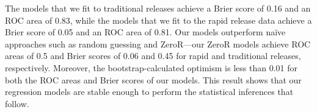\begin{sloppypar}
\noindent{}
The models that we fit to traditional releases achieve a Brier score of 0.16 and
an ROC area of 0.83, while the models that we fit to the rapid release data
achieve a Brier score of 0.05 and an ROC area of 0.81. Our models outperform
na\"{i}ve approaches such as random guessing and ZeroR---our ZeroR models
achieve ROC areas of 0.5 and Brier scores of 0.06 and 0.45 for rapid and
traditional releases, respectively. Moreover, the bootstrap-calculated optimism
is less than 0.01 for both the ROC areas and Brier scores of our models. This
result shows that our regression models are stable enough to perform the
statistical inferences that follow.\\


\end{sloppypar}
